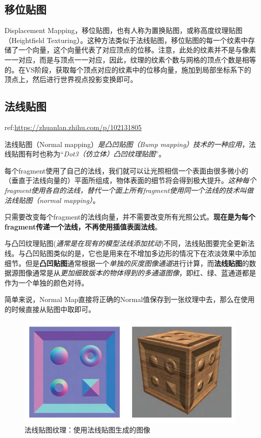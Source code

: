 \documentclass[UTF8,a4paper,12pt]{ctexbook}
\begin{document}
						
		\subsection{移位贴图}
			Displacement Mapping，移位贴图，也有人称为置换贴图，或称高度纹理贴图（Heightfield Texturing）。这种方法类似于法线贴图，移位贴图的每一个纹素中存储了一个向量，这个向量代表了对应顶点的位移。注意，此处的纹素并不是与像素一一对应，而是与顶点一一对应，因此，纹理的纹素个数与网格的顶点个数是相等的。在VS阶段，获取每个顶点对应的纹素中的位移向量，施加到局部坐标系下的顶点上，然后进行世界视点投影变换即可。
		
		
		\subsection{法线贴图}
			ref:\url{https://zhuanlan.zhihu.com/p/102131805}
		
			法线贴图（Normal mapping）\textit{是凸凹贴图（Bump mapping）技术的一种应用}，法线贴图有时也称为“\textit{Dot3（仿立体）凸凹纹理贴图}”。
			
			每个fragment使用了自己的法线，我们就可以让光照相信一个表面由很多微小的（垂直于法线向量的）平面所组成，物体表面的细节将会得到极大提升。\textit{这种每个fragment使用各自的法线，替代一个面上所有fragment使用同一个法线的技术叫做法线贴图（normal mapping）}。
			
			只需要改变每个fragment的法线向量，并不需要改变所有光照公式。\textbf{现在是为每个fragment传递一个法线，不再使用插值表面法线}。
			
			与凸凹纹理贴图(\textit{通常是在现有的模型法线添加扰动})不同，法线贴图要完全更新法线。与凸凹贴图类似的是，它也是用来在不增加多边形的情况下在浓淡效果中添加细节。但是\textbf{凸凹贴图}通常根据一个\textit{单独的灰度图像通道}进行计算，而\textbf{法线贴图}的数据源图像通常是从\textit{更加细致版本的物体得到的多通道图像}，即红、绿、蓝通道都是作为一个单独的颜色对待。
		
			简单来说，Normal Map直接将正确的Normal值保存到一张纹理中去，那么在使用的时候直接从贴图中取即可。
			
			\begin{figure}[H]
				\centering
				\includegraphics[width=\linewidth]{normalMap}
				\caption{法线贴图纹理：使用法线贴图生成的图像}
			\end{figure}
			
\end{document}
